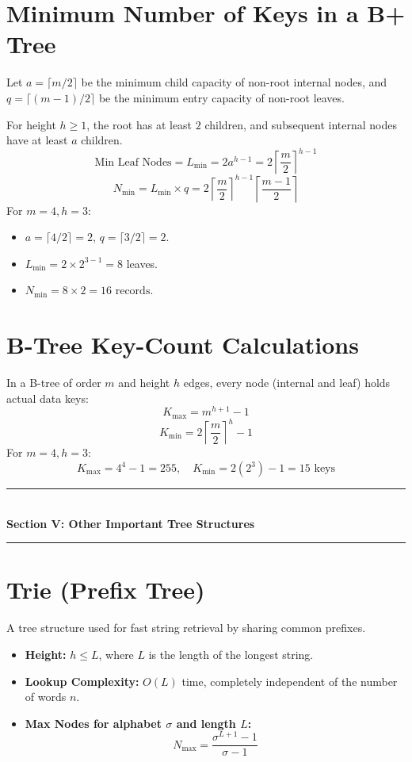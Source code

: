 \section{Minimum Number of Keys in a B+ Tree}

Let $a = \lceil m/2 \rceil$ be the minimum child capacity of non-root internal nodes, and $q = \lceil (m - 1)/2 \rceil$ be the minimum entry capacity of non-root leaves.

For height $h \geq 1$, the root has at least $2$ children, and subsequent internal nodes have at least $a$ children.
\[
\text{Min Leaf Nodes} = L_{\min} = 2 a^{h - 1} = 2 \left\lceil \frac{m}{2} \right\rceil^{h - 1}
\]
\[
\boxed{N_{\min} = L_{\min} \times q = 2 \left\lceil \frac{m}{2} \right\rceil^{h - 1} \left\lceil \frac{m - 1}{2} \right\rceil}
\]
For $m=4, h=3$:
\begin{itemize}
    \item $a = \lceil 4/2 \rceil = 2$, $q = \lceil 3/2 \rceil = 2$.
    \item $L_{\min} = 2 \times 2^{3-1} = 8$ leaves.
    \item $\boxed{N_{\min} = 8 \times 2 = 16 \text{ records}}$.
\end{itemize}

\section{B-Tree Key-Count Calculations}

In a B-tree of order $m$ and height $h$ edges, every node (internal and leaf) holds actual data keys:
\[
\boxed{K_{\max} = m^{h+1} - 1}
\]
\[
\boxed{K_{\min} = 2 \left\lceil \frac{m}{2} \right\rceil^h - 1}
\]
For $m=4, h=3$:
\[
K_{\max} = 4^4 - 1 = 255, \quad K_{\min} = 2(2^3) - 1 = 15 \text{ keys}
\]

\begin{center}
\vspace{1em}
{\color{primary}\rule{0.45\textwidth}{1.2pt}}\\[4pt]
{\Large\bfseries\color{primary} Section V: Other Important Tree Structures}\\[2pt]
{\color{primary}\rule{0.45\textwidth}{1.2pt}}
\vspace{0.5em}
\end{center}

\section{Trie (Prefix Tree)}
A tree structure used for fast string retrieval by sharing common prefixes.
\begin{itemize}
    \item \textbf{Height:} $h \leq L$, where $L$ is the length of the longest string.
    \item \textbf{Lookup Complexity:} $O(L)$ time, completely independent of the number of words $n$.
    \item \textbf{Max Nodes for alphabet $\sigma$ and length $L$:}
    \[
    N_{\max} = \frac{\sigma^{L+1} - 1}{\sigma - 1}
    \]
\end{itemize}

